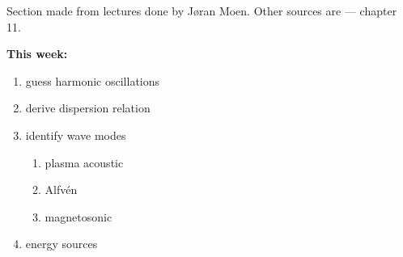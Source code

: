 \begin{remark}
    Section made from lectures done by Jøran Moen. Other sources are \citet{1995Itsp} --- chapter 11.
\end{remark}
\noindent\textbf{This week:}
\begin{enumerate}[\(\bullet \)]
    \item guess harmonic oscillations
    \item derive dispersion relation
    \item identify wave modes\begin{enumerate}[\(\triangleright \)]
        \item plasma acoustic
        \item Alfvén
        \item magnetosonic
    \end{enumerate}
    \item energy sources
\end{enumerate}

